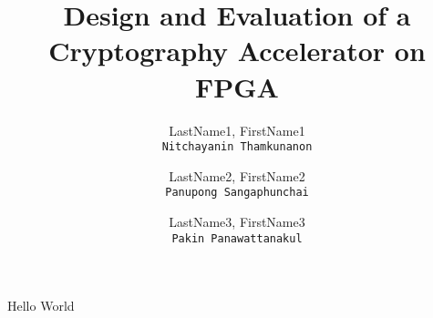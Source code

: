 \documentclass[a4paper]{article} %
\title{Design and Evaluation of a Cryptography Accelerator on FPGA}
\author{
	LastName1, FirstName1\\
	\texttt{Nitchayanin Thamkunanon} 
	\and
	LastName2, FirstName2\\
	\texttt{Panupong Sangaphunchai}
	\and
	LastName3, FirstName3\\
	\texttt{Pakin Panawattanakul}
}
\begin{document}
	\maketitle
	Hello World
	
\end{document}
